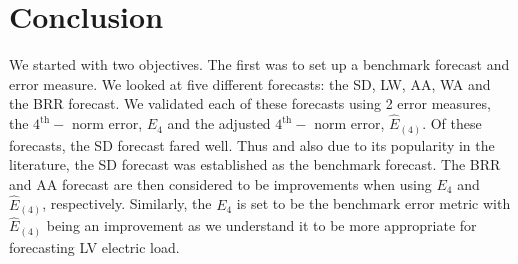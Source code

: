 
\chapter{Conclusion}

We started with two objectives. The first was to set up a benchmark forecast and error measure. We looked at five different forecasts: the SD, LW, AA, WA and the BRR forecast. We validated each of these forecasts using 2 error measures, the $4^{\text{th}}-$ norm error, $E_4$ and the adjusted $4^{\text{th}}-$ norm error, $\hat{E}_{(4)}$. Of these forecasts, the SD forecast fared well. Thus and also due to its popularity in the literature, the SD forecast was established as the benchmark forecast. The BRR and AA forecast are then considered to be improvements when using $E_4$ and $\hat{E}_{(4)}$, respectively. Similarly, the $E_4$ is set to be the benchmark error metric with $\hat{E}_{(4)}$  being an improvement as we understand it to be more appropriate for forecasting LV electric load.


